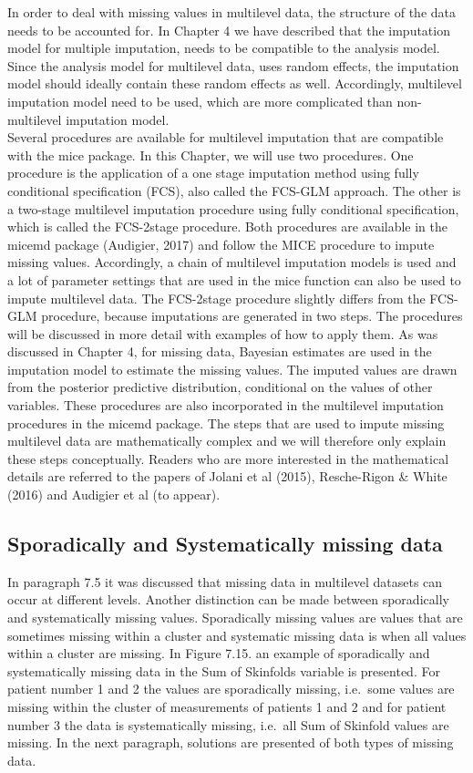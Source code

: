 \documentclass[]{book}
\theoremstyle{definition}
\theoremstyle{definition}
\theoremstyle{definition}
\theoremstyle{remark}
\begin{document}
In order to deal with missing values in multilevel data, the structure
of the data needs to be accounted for. In Chapter 4 we have described
that the imputation model for multiple imputation, needs to be
compatible to the analysis model. Since the analysis model for
multilevel data, uses random effects, the imputation model should
ideally contain these random effects as well. Accordingly, multilevel
imputation model need to be used, which are more complicated than
non-multilevel imputation model.\\
Several procedures are available for multilevel imputation that are
compatible with the mice package. In this Chapter, we will use two
procedures. One procedure is the application of a one stage imputation
method using fully conditional specification (FCS), also called the
FCS-GLM approach. The other is a two-stage multilevel imputation
procedure using fully conditional specification, which is called the
FCS-2stage procedure. Both procedures are available in the micemd
package (Audigier, 2017) and follow the MICE procedure to impute missing
values. Accordingly, a chain of multilevel imputation models is used and
a lot of parameter settings that are used in the mice function can also
be used to impute multilevel data. The FCS-2stage procedure slightly
differs from the FCS-GLM procedure, because imputations are generated in
two steps. The procedures will be discussed in more detail with examples
of how to apply them. As was discussed in Chapter 4, for missing data,
Bayesian estimates are used in the imputation model to estimate the
missing values. The imputed values are drawn from the posterior
predictive distribution, conditional on the values of other variables.
These procedures are also incorporated in the multilevel imputation
procedures in the micemd package. The steps that are used to impute
missing multilevel data are mathematically complex and we will therefore
only explain these steps conceptually. Readers who are more interested
in the mathematical details are referred to the papers of Jolani et al
(2015), Resche-Rigon \& White (2016) and Audigier et al (to appear).

\subsection{Sporadically and Systematically missing
data}\label{sporadically-and-systematically-missing-data-1}

In paragraph 7.5 it was discussed that missing data in multilevel
datasets can occur at different levels. Another distinction can be made
between sporadically and systematically missing values. Sporadically
missing values are values that are sometimes missing within a cluster
and systematic missing data is when all values within a cluster are
missing. In Figure 7.15. an example of sporadically and systematically
missing data in the Sum of Skinfolds variable is presented. For patient
number 1 and 2 the values are sporadically missing, i.e.~some values are
missing within the cluster of measurements of patients 1 and 2 and for
patient number 3 the data is systematically missing, i.e.~all Sum of
Skinfold values are missing. In the next paragraph, solutions are
presented of both types of missing data.
\end{document}
